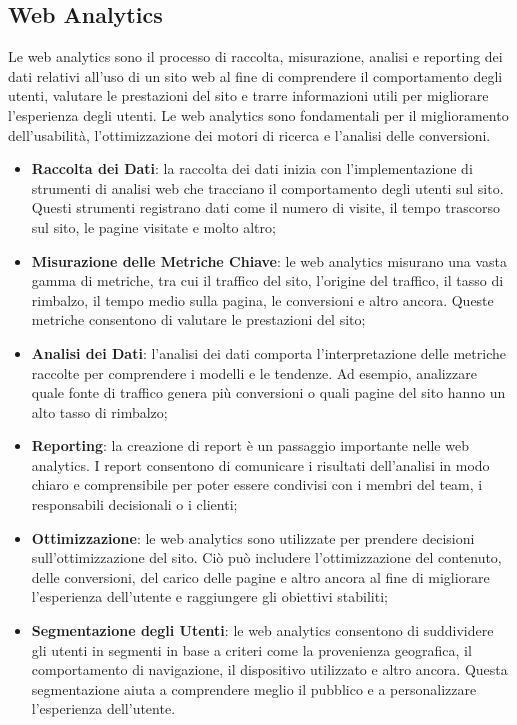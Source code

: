 \documentclass[target=bach,aauheader=]{thud}
\begin{document}
\subsection{Web Analytics}
Le web analytics sono il processo di raccolta, misurazione, analisi e reporting dei dati relativi all'uso di un sito web al fine di comprendere il comportamento degli utenti, valutare le prestazioni del sito e trarre informazioni utili per  migliorare l'esperienza degli utenti. 
Le web analytics sono fondamentali per il miglioramento dell'usabilità, l'ottimizzazione dei motori di ricerca e l'analisi delle conversioni.
\begin{itemize}
    \item \textbf{Raccolta dei Dati}: la raccolta dei dati inizia con l'implementazione di strumenti di analisi web che tracciano il comportamento degli utenti sul sito. Questi strumenti registrano dati come il numero di visite, il tempo trascorso sul sito, le pagine visitate e molto altro;
    \item \textbf{Misurazione delle Metriche Chiave}: le web analytics misurano una vasta gamma di metriche, tra cui il traffico del sito, l'origine del traffico, il tasso di rimbalzo, il tempo medio sulla pagina, le conversioni e altro ancora. Queste metriche consentono di valutare le prestazioni del sito;
    \item \textbf{Analisi dei Dati}: l'analisi dei dati comporta l'interpretazione delle metriche raccolte per comprendere i modelli e le tendenze. Ad esempio, analizzare quale fonte di traffico genera più conversioni o quali pagine del sito hanno un alto tasso di rimbalzo;
    \item \textbf{Reporting}: la creazione di report è un passaggio importante nelle web analytics. I report consentono di comunicare i risultati dell'analisi in modo chiaro e comprensibile per poter essere condivisi con i membri del team, i responsabili decisionali o i clienti;
    \item \textbf{Ottimizzazione}: le web analytics sono utilizzate per prendere decisioni sull'ottimizzazione del sito. Ciò può includere l'ottimizzazione del contenuto, delle conversioni, del carico delle pagine e altro ancora al fine di migliorare l'esperienza dell'utente e raggiungere gli obiettivi stabiliti;
    \item \textbf{Segmentazione degli Utenti}: le web analytics consentono di suddividere gli utenti in segmenti in base a criteri come la provenienza geografica, il comportamento di navigazione, il dispositivo utilizzato e altro ancora. Questa segmentazione aiuta a comprendere meglio il pubblico e a personalizzare l'esperienza dell'utente.
\end{itemize}
\end{document}
